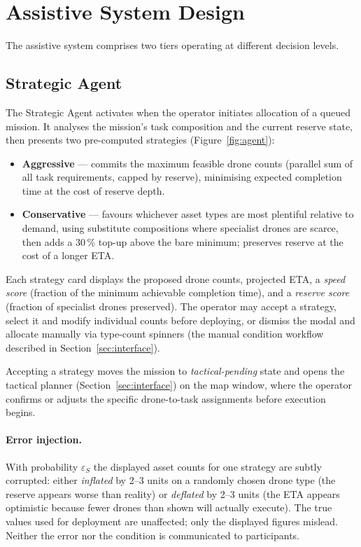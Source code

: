 \documentclass[10pt]{article}
\theoremstyle{definition}
\begin{document}
\section{Assistive System Design}\label{sec:agents}

The assistive system comprises two tiers operating at different decision levels.

\subsection{Strategic Agent}\label{sec:strategic}

The Strategic Agent activates when the operator initiates allocation of a queued mission. It analyses the mission's task composition and the current reserve state, then presents two pre-computed strategies (Figure~\ref{fig:agent}):

\begin{itemize}[noitemsep]
  \item \textbf{Aggressive} --- commits the maximum feasible drone counts (parallel sum of all task requirements, capped by reserve), minimising expected completion time at the cost of reserve depth.
  \item \textbf{Conservative} --- favours whichever asset types are most plentiful relative to demand, using substitute compositions where specialist drones are scarce, then adds a 30\,\% top-up above the bare minimum; preserves reserve at the cost of a longer ETA.
\end{itemize}

Each strategy card displays the proposed drone counts, projected ETA, a \emph{speed score} (fraction of the minimum achievable completion time), and a \emph{reserve score} (fraction of specialist drones preserved). The operator may accept a strategy, select it and modify individual counts before deploying, or dismiss the modal and allocate manually via type-count spinners (the manual condition workflow described in Section~\ref{sec:interface}).

Accepting a strategy moves the mission to \emph{tactical-pending} state and opens the tactical planner (Section~\ref{sec:interface}) on the map window, where the operator confirms or adjusts the specific drone-to-task assignments before execution begins.

\paragraph{Error injection.} With probability $\varepsilon_S$ the displayed asset counts for one strategy are subtly corrupted: either \emph{inflated} by 2--3 units on a randomly chosen drone type (the reserve appears worse than reality) or \emph{deflated} by 2--3 units (the ETA appears optimistic because fewer drones than shown will actually execute). The true values used for deployment are unaffected; only the displayed figures mislead. Neither the error nor the condition is communicated to participants.
\end{document}
